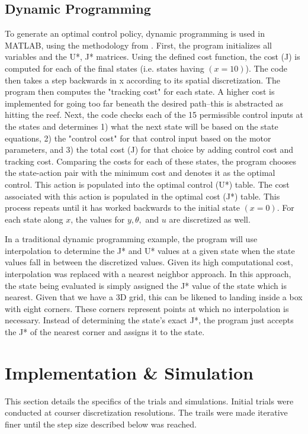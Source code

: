 \subsection{Dynamic Programming}
To generate an optimal control policy, dynamic programming is used in MATLAB, using the methodology from \parencite{kirk2012optimal}. First, the program initializes all variables and the U*, J* matrices. Using the defined cost function, the cost (J) is computed for each of the final states (i.e. states having $(x=10)$). The code then takes a step backwards in x according to its spatial discretization. The program then computes the "tracking cost" for each state. A higher cost is implemented for going too far beneath the desired path--this is abstracted as hitting the reef. Next, the code checks each of the 15 permissible control inputs at the states and determines 1) what the next state will be based on the state equations, 2) the "control cost" for that control input based on the motor parameters, and 3) the total cost (J) for that choice by adding control cost and tracking cost. Comparing the costs for each of these states, the program chooses the state-action pair with the minimum cost and denotes it as the optimal control. This action is populated into the optimal control (U*) table. The cost associated with this action is populated in the optimal cost (J*) table. This process repeats until it has worked backwards to the initial state $(x=0)$. For each state along $x$, the values for $y, \theta, $ and $u$ are discretized as well.

In a traditional dynamic programming example, the program will use interpolation to determine the J* and U* values at a given state when the state values fall in between the discretized values. Given its high computational cost, interpolation was replaced with a nearest neighbor approach. In this approach, the state being evaluated is simply assigned the J* value of the state which is nearest. Given that we have a 3D grid, this can be likened to landing inside a box with eight corners. These corners represent points at which no interpolation is necessary. Instead of determining the state's exact J*, the program just accepts the J* of the nearest corner and assigns it to the state. 

\section{Implementation \& Simulation}
This section details the specifics of the trials and simulations. Initial trials were conducted at courser discretization resolutions. The trails were made iterative finer until the step size described below was reached.

